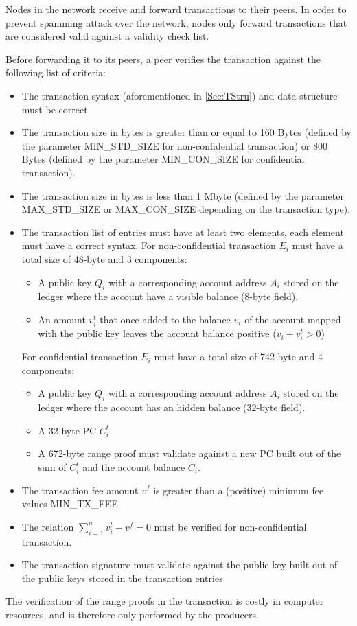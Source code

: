 Nodes in the network receive and forward transactions to their peers. In order to prevent spamming attack over the network,  nodes only forward transactions that are considered valid against a validity check list. 

 Before forwarding it to its peers, a peer verifies the transaction against the following list of criteria:
 
\begin{itemize}
\item The transaction syntax (aforementioned in \ref{Sec:TStru}) and data structure must be correct.
\item The transaction size in bytes is greater than or equal to 160 Bytes (defined by the parameter MIN\_STD\_SIZE for non-confidential transaction) or 800 Bytes (defined by the parameter MIN\_CON\_SIZE for confidential transaction).
\item The transaction size in bytes is less than 1 Mbyte (defined by the parameter MAX\_STD\_SIZE or MAX\_CON\_SIZE depending on the transaction type).
\item The transaction list of entries must have at least two elements, each element must have a correct syntax. For non-confidential transaction $E_i$ must have a total size of 48-byte and 3 components:
\begin{itemize}
\item A public key $Q_i$ with a corresponding account address $A_i$ stored on the ledger where the account have a visible balance (8-byte field).
\item An amount $v_i^t$ that once added to the balance $v_i$ of the account mapped with the public key leaves the account balance positive ($v_i+v_i^t > 0$)
\end{itemize}
For confidential transaction $E_i$ must have a total size of 742-byte and 4 components:

\begin{itemize}
\item A public key $Q_i$ with a corresponding account address $A_i$ stored on the ledger where the account has an hidden balance (32-byte field).   
\item A 32-byte PC $C_i^t$ 
\item A 672-byte range proof must validate against a new PC built out of the sum of $C_i^t$ and the account balance $C_i$. 
\end{itemize}

\item The transaction fee amount $v^f$ is greater than a (positive) minimum fee values MIN\_TX\_FEE
\item The relation $\sum_{i=1}^{n}v^t_i - v^f = 0$ must be verified for non-confidential transaction.
\item The transaction signature must validate against the public key built out of the public keys stored in the transaction entries 
\end{itemize}

The verification of the range proofs in the transaction is costly in computer resources, and is therefore only performed by the producers. \\